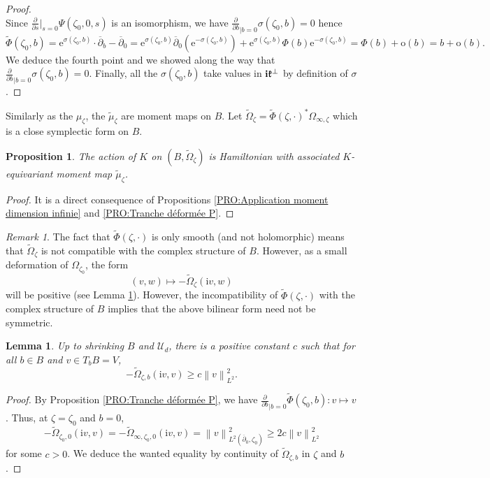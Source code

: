 \documentclass{article}
\newtheorem{lemma}[theorem]{Lemma}
\newtheorem{proposition}[theorem]{Proposition}
\theoremstyle{remark}
\newtheorem*{remark}{Remark}
\theoremstyle{definition}
\renewcommand{\i}{\boldsymbol{\mathrm{i}}}
\newcommand{\e}{\boldsymbol{\mathrm{e}}}
\newcommand{\norme}[1]{\left\| #1 \right\|}
\newcommand{\mU}{\mathcal{U}}
\newcommand{\dbar}{\overline{\partial}}
\renewcommand{\geq}{\geqslant}
\begin{document}
\begin{proof}
$$$$
Since $\frac{\partial}{\partial s}|_{s = 0}\Psi(\zeta_0,0,s)$ is an isomorphism, we have $\frac{\partial}{\partial b}_{|b = 0}\sigma(\zeta_0,b) = 0$ hence
$$
\tilde{\Phi}(\zeta_0,b) = \e^{\sigma(\zeta_0,b)} \cdot \dbar_b - \dbar_0 = \e^{\sigma(\zeta_0,b)}\dbar_0(\e^{-\sigma(\zeta_0,b)}) + \e^{\sigma(\zeta_0,b)}\Phi(b)\e^{-\sigma(\zeta_0,b)} = \Phi(b) + \mathrm{o}(b) = b + \mathrm{o}(b).
$$
We deduce the fourth point and we showed along the way that $\frac{\partial}{\partial b}_{|b = 0}\sigma(\zeta_0,b) = 0$. Finally, all the $\sigma(\zeta_0,b)$ take values in $\i\frak{k}^\bot$ by definition of $\sigma$.
\end{proof}

Similarly as the $\mu_\zeta$, the $\tilde{\mu}_\zeta$ are moment maps on $B$. Let $\tilde{\Omega}_\zeta = \tilde{\Phi}(\zeta,\cdot)^*\Omega_{\infty,\zeta}$ which is a close symplectic form on $B$.

\begin{proposition}
    The action of $K$ on $(B,\tilde{\Omega}_\zeta)$ is Hamiltonian with associated $K$-equivariant moment map $\tilde{\mu}_\zeta$.
\end{proposition}
\begin{proof}
It is a direct consequence of Propositions \ref{PRO:Application moment dimension infinie} and \ref{PRO:Tranche déformée P}.
\end{proof}

\begin{remark}
    The fact that $\tilde{\Phi}(\zeta,\cdot)$ is only smooth (and not holomorphic) means that $\tilde{\Omega}_\zeta$ is not compatible with the complex structure of $B$. However, as a small deformation of $\Omega_{\zeta_0}$, the form
    $$
    (v,w) \mapsto -\tilde{\Omega}_\zeta(\i v,w)
    $$
    will be positive (see Lemma \ref{LEM:Omega tilde positive}). However, the incompatibility of $\tilde{\Phi}(\zeta,\cdot)$ with the complex structure of $B$ implies that the above bilinear form need not be symmetric.
\end{remark}

\begin{lemma}\label{LEM:Omega tilde positive}
    Up to shrinking $B$ and $\mU_d$, there is a positive constant $c$ such that for all $b \in B$ and $v \in T_bB = V$,
    $$
    -\tilde{\Omega}_{\zeta,b}(\i v,v) \geq c\norme{v}_{L^2}^2.
    $$
\end{lemma}
\begin{proof}
By Proposition \ref{PRO:Tranche déformée P}, we have $\frac{\partial}{\partial b}_{|b = 0}\tilde{\Phi}(\zeta_0,b) : v \mapsto v$. Thus, at $\zeta = \zeta_0$ and $b = 0$,
$$
-\tilde{\Omega}_{\zeta_0,0}(\i v,v) = -\tilde{\Omega}_{\infty,\zeta_0,0}(\i v,v) = \norme{v}_{L^2(\dbar_0,\zeta_0)}^2 \geq 2c\norme{v}_{L^2}^2
$$
for some $c > 0$. We deduce the wanted equality by continuity of $\tilde{\Omega}_{\zeta,b}$ in $\zeta$ and $b$.
\end{proof}
\end{document}
